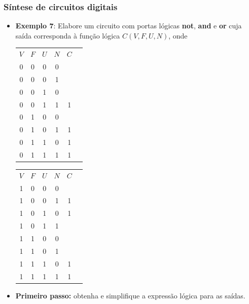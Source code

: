 \documentclass{beamer}
\begin{document}
\begin{frame}
\frametitle{Síntese de circuitos digitais}

\def\Zero{\raisebox{0pt}{\color{structure.fg!70!white}0}}

\begin{itemize}
\item \textbf{Exemplo 7}: Elabore um circuito com portas lógicas \textbf{not}, \textbf{and} e \textbf{or} cuja saída corresponda à função lógica $C(V,F,U,N)$, onde\\[12pt]
\begin{tabular}{c@{ }c@{ }c@{ }c||c@{ }l}
 $V$ & $F$ & $U$ & $N$ & $C$ \\
\cline{1-5}
  0  &  0  &  0  &  0  &  \Zero  \\
  0  &  0  &  0  &  1  &  \Zero  \\
  0  &  0  &  1  &  0  &  \Zero  \\
  0  &  0  &  1  &  1  &  1  \\
  0  &  1  &  0  &  0  &  \Zero  \\
  0  &  1  &  0  &  1  &  1  \\
  0  &  1  &  1  &  0  &  1  \\
  0  &  1  &  1  &  1  &  1  \\
\end{tabular}
\hspace{4ex}
\begin{tabular}{c@{ }c@{ }c@{ }c||cl}
 $V$ & $F$ & $U$ & $N$ & $C$ \\
\cline{1-5}
  1  &  0  &  0  &  0  &  \Zero  \\
  1  &  0  &  0  &  1  &  1  \\
  1  &  0  &  1  &  0  &  1  \\
  1  &  0  &  1  &  1  &  \Zero  \\
  1  &  1  &  0  &  0  &  \Zero  \\
  1  &  1  &  0  &  1  &  \Zero  \\
  1  &  1  &  1  &  0  &  1  \\
  1  &  1  &  1  &  1  &  1  \\
\end{tabular}
\end{itemize}

\pause

\begin{itemize}
\item \textbf{Primeiro passo: } obtenha e simplifique a expressão lógica para as saídas.
\end{itemize}

\end{frame}
\end{document}
